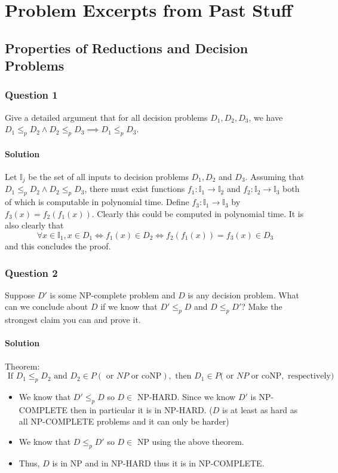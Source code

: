 \documentclass[10pt]{article}
\begin{document}
\newpage
\section{Problem Excerpts from Past Stuff}
\subsection{Properties of Reductions and Decision Problems}
\subsubsection{Question 1} Give a detailed argument that for all decision problems $D_1,D_2,D_3$, we have $D_1 \leq_p D_2 \wedge D_2 \leq_p D_3\implies D_1 \leq_p D_3$. 
\paragraph{Solution} Let $\mathbb{I}_j$ be the set of all inputs to decision problems $D_1, D_2$ and $D_3$. Assuming that $D_1 \leq_p D_2 \wedge D_2 \leq_p D_3$, there must exist functions $f_1: \mathbb{I}_1 \rightarrow \mathbb{I}_2$ and $f_2:  \mathbb{I}_2 \rightarrow \mathbb{I}_3$ both of which is computable in polynomial time. Define $f_3: \mathbb{I}_1 \rightarrow \mathbb{I}_3$ by $f_3(x) = f_2(f_1(x))$. Clearly this could be computed in polynomial time. It is also clearly that
\begin{equation*}
    \forall x \in \mathbb{I}_{1}, x \in D_{1} \Leftrightarrow f_{1}(x) \in D_{2} \Leftrightarrow f_{2}\left(f_{1}(x)\right)=f_{3}(x) \in D_{3}
\end{equation*}
and this concludes the proof. 



\subsubsection{Question 2} Suppose $D′$ is some NP-complete problem and $D$ is any decision problem. What can we conclude about $D$ if we know that $D′\leq_p D$ and $D\leq_p D′$? Make the strongest claim you can and prove it. 
\paragraph{Solution} 

\color{Red}
Theorem: $$
    \text { If } D_{1} \leq_{p} D_{2} \text { and } D_{2} \in P(\text { or } N P \text { or } \mathrm{coNP}), \text { then } D_{1} \in P(\text { or } N P \text { or } \mathrm{coNP},\text { respectively) } $$ \color{Black}
\begin{itemize}
    \item We know that $D'\leq_p D$ so $D\in $ NP-HARD. Since we know $D'$ is NP-COMPLETE then in particular it is in NP-HARD. ($D$ is at least as hard as all NP-COMPLETE problems and it can only be harder)
    \item We know that $D\leq_p D'$ so $D\in$ NP using the above theorem.
    \item Thus, $D$ is in NP and in NP-HARD thus it is in NP-COMPLETE.
\end{itemize}
\end{document}
